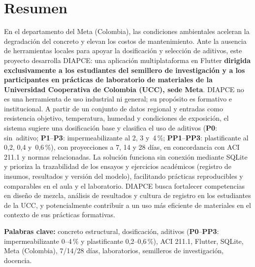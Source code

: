 \section{Resumen}

En el departamento del Meta (Colombia), las condiciones ambientales aceleran la degradación del concreto y elevan los costos de mantenimiento. Ante la ausencia de herramientas locales para apoyar la dosificación y selección de aditivos, este proyecto desarrolla DIAPCE: una aplicación multiplataforma en Flutter \textbf{dirigida exclusivamente a los estudiantes del semillero de investigación y a los participantes en prácticas de laboratorio de materiales de la Universidad Cooperativa de Colombia (UCC), sede Meta}. DIAPCE no es una herramienta de uso industrial ni general; su propósito es formativo e institucional. A partir de un conjunto de datos regional y entradas como resistencia objetivo, temperatura, humedad y condiciones de exposición, el sistema sugiere una dosificación base y clasifica el uso de aditivos (\textbf{P0}: sin~aditivo; \textbf{P1}--\textbf{P3}: impermeabilizante al 2, 3 y~4\,\%; \textbf{PP1}--\textbf{PP3}: plastificante al 0{,}2, 0{,}4 y~0{,}6\,\%), con proyecciones a 7, 14 y 28 días, en concordancia con ACI 211.1 y normas relacionadas. La solución funciona sin conexión mediante SQLite y prioriza la trazabilidad de los ensayos y ejercicios académicos (registro de insumos, resultados y versión del modelo), facilitando prácticas reproducibles y comparables en el aula y el laboratorio. DIAPCE busca fortalecer competencias en diseño de mezcla, análisis de resultados y cultura de registro en los estudiantes de la UCC, y potencialmente contribuir a un uso más eficiente de materiales en el contexto de sus prácticas formativas.

\vspace{0.5em}
\noindent\textbf{Palabras clave:} concreto estructural, dosificación, aditivos (\textbf{P0}–\textbf{PP3}: impermeabilizante 0--4\,\% y plastificante 0{,}2--0{,}6\,\%), ACI 211.1, Flutter, SQLite, Meta (Colombia), 7/14/28 días, laboratorios, semilleros de investigación, docencia.
